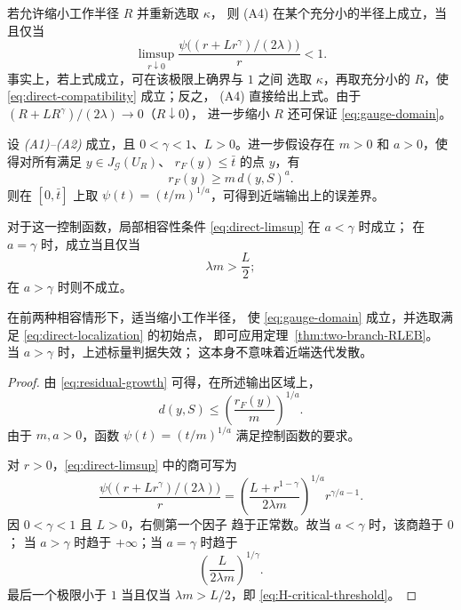 若允许缩小工作半径 $R$ 并重新选取 $\kappa$，
则 (A4) 在某个充分小的半径上成立，当且仅当
\begin{equation}
\label{eq:direct-limsup}
 \limsup_{r\downarrow0}
 \frac{\psi\bigl((r+Lr^\gamma)/(2\lambda)\bigr)}{r}<1.
\end{equation}
事实上，若上式成立，可在该极限上确界与 $1$ 之间
选取 $\kappa$，再取充分小的 $R$，使
\eqref{eq:direct-compatibility} 成立；反之，
(A4) 直接给出上式。由于
$(R+LR^\gamma)/(2\lambda)\to0$（$R\downarrow0$），
进一步缩小 $R$ 还可保证
\eqref{eq:gauge-domain}。

\begin{corollary}[残差增长条件与临界阶]
\label{cor:residual-growth}
设 \emph{(A1)--(A2)} 成立，且
$0<\gamma<1$、$L>0$。进一步假设存在
$m>0$ 和 $a>0$，使得对所有满足
$y\in J_{\mathcal G}(U_R)$、
$r_F(y)\leq\bar t$ 的点 $y$，有
\begin{equation}
\label{eq:residual-growth}
 r_F(y)\geq m\,d(y,S)^a.
\end{equation}
则在 $[0,\bar t]$ 上取
$\psi(t)=(t/m)^{1/a}$，可得到近端输出上的误差界。

对于这一控制函数，局部相容性条件
\eqref{eq:direct-limsup} 在 $a<\gamma$ 时成立；
在 $a=\gamma$ 时，成立当且仅当
\begin{equation}
\label{eq:H-critical-threshold}
 \lambda m>\frac L2;
\end{equation}
在 $a>\gamma$ 时则不成立。

在前两种相容情形下，适当缩小工作半径，
使 \eqref{eq:gauge-domain} 成立，并选取满足
\eqref{eq:direct-localization} 的初始点，
即可应用定理~\ref{thm:two-branch-RLEB}。
当 $a>\gamma$ 时，上述标量判据失效；
这本身不意味着近端迭代发散。
\end{corollary}

\begin{proof}
由 \eqref{eq:residual-growth} 可得，在所述输出区域上，
\[
 d(y,S)\leq
 \left(\frac{r_F(y)}{m}\right)^{1/a}.
\]
由于 $m,a>0$，函数
$\psi(t)=(t/m)^{1/a}$ 满足控制函数的要求。

对 $r>0$，\eqref{eq:direct-limsup} 中的商可写为
\[
 \frac{\psi\bigl((r+Lr^\gamma)/(2\lambda)\bigr)}{r}
 =
 \left(\frac{L+r^{1-\gamma}}{2\lambda m}\right)^{1/a}
 r^{\gamma/a-1}.
\]
因 $0<\gamma<1$ 且 $L>0$，右侧第一个因子
趋于正常数。故当 $a<\gamma$ 时，该商趋于 $0$；
当 $a>\gamma$ 时趋于 $+\infty$；当 $a=\gamma$ 时趋于
\[
 \left(\frac{L}{2\lambda m}\right)^{1/\gamma}.
\]
最后一个极限小于 $1$ 当且仅当
$\lambda m>L/2$，即 \eqref{eq:H-critical-threshold}。
\end{proof}


